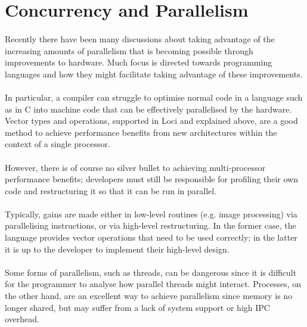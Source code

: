 \documentclass[12pt,twoside,notitlepage]{report}
\begin{document}
\section{Concurrency and Parallelism}

\paragraph{}
Recently there have been many discussions about taking advantage of the increasing amounts of parallelism that is becoming possible through improvements to hardware. Much focus is directed towards programming languages and how they might facilitate taking advantage of these improvements.

\paragraph{}
In particular, a compiler can struggle to optimise normal code in a language such as in C into machine code that can be effectively parallelised by the hardware. Vector types and operations, supported in Loci and explained above, are a good method to achieve performance benefits from new architectures within the context of a single processor.

\paragraph{}
However, there is of course no silver bullet to achieving multi-processor performance benefits; developers must still be responsible for profiling their own code and restructuring it so that it can be run in parallel.

\paragraph{}
Typically, gains are made either in low-level routines (e.g. image processing) via parallelising instructions, or via high-level restructuring. In the former case, the language provides vector operations that need to be used correctly; in the latter it is up to the developer to implement their high-level design.

\paragraph{}
Some forms of parallelism, such as threads, can be dangerous since it is difficult for the programmer to analyse how parallel threads might interact. Processes, on the other hand, are an excellent way to achieve parallelism since memory is no longer shared, but may suffer from a lack of system support or high IPC overhead.
\end{document}
